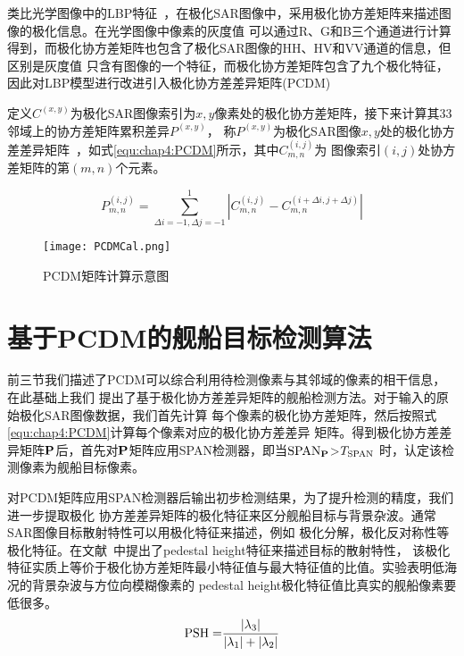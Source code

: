     类比光学图像中的LBP特征~\cite{Lan2017Quaternionic}，在极化SAR图像中，采用极化协方差矩阵来描述图像的极化信息。在光学图像中像素的灰度值
    可以通过R、G和B三个通道进行计算得到，而极化协方差矩阵也包含了极化SAR图像的HH、HV和VV通道的信息，但区别是灰度值
    只含有图像的一个特征，而极化协方差矩阵包含了九个极化特征，因此对LBP模型进行改进引入极化协方差差异矩阵(PCDM)

    定义${C^{(x,y)}}$为极化SAR图像索引为$x,y$像素处的极化协方差矩阵，接下来计算其3\times 3邻域上的协方差矩阵累积差异$P^{(x,y)}$，
    称$P^{(x,y)}$为极化SAR图像$x,y$处的极化协方差差异矩阵~\cite{张程2018基于}，如式\ref{equ:chap4:PCDM}所示，其中$C_{m,n}^{(i,j)}$为
    图像索引$(i,j)$处协方差矩阵的第$(m,n)$个元素。

    \begin{equation}
        \label{equ:chap4:PCDM}
        P_{m,n}^{(i,j)} = \sum\limits_{\Delta i =  - 1,\Delta j =  - 1}^1 {\left| {C_{m,n}^{(i,j)} - C_{m,n}^{(i + \Delta i,j + \Delta j)}} \right|}
    \end{equation}

    \begin{figure}[H] %
      \centering
      \texttt{[image: PCDMCal.png]}
      \caption{PCDM矩阵计算示意图}
      \label{fig:chap4:PCDM}
    \end{figure}   
  \section{基于PCDM的舰船目标检测算法}
      前三节我们描述了PCDM可以综合利用待检测像素与其邻域的像素的相干信息，在此基础上我们
      提出了基于极化协方差差异矩阵的舰船检测方法。对于输入的原始极化SAR图像数据，我们首先计算
      每个像素的极化协方差矩阵，然后按照式\ref{equ:chap4:PCDM}计算每个像素对应的极化协方差差异
      矩阵。得到极化协方差差异矩阵$\bf{P}$后，首先对$\bf{P}$矩阵应用SPAN检测器，即当$\rm{SPAN}_{\bf{P}}$>$T_{\rm{SPAN}}$
      时，认定该检测像素为舰船目标像素。

      对PCDM矩阵应用SPAN检测器后输出初步检测结果，为了提升检测的精度，我们进一步提取极化
      协方差差异矩阵的极化特征来区分舰船目标与背景杂波。通常SAR图像目标散射特性可以用极化特征来描述，例如
      极化分解，极化反对称性等极化特征。在文献~\cite{Durden1990The}中提出了pedestal height特征来描述目标的散射特性，
      该极化特征实质上等价于极化协方差矩阵最小特征值与最大特征值的比值。实验表明低海况的背景杂波与方位向模糊像素的
      pedestal height极化特征值比真实的舰船像素要低很多。
       \begin{equation}
          {\rm{PSH = }}\frac{{\left| {{\lambda _3}} \right|}}{{\left| {{\lambda _1}} \right| + \left| {{\lambda _2}} \right|}}
      \end{equation}

